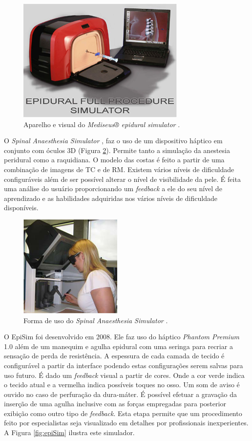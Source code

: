 \begin{figure}[ht!]
    \centering
    \includegraphics[width=0.6\linewidth]{capitulos/figuras/mediseusSimulator.png} 
    \caption{Aparelho e visual do \textit{Mediseus® epidural simulator}  \cite{Mayooran2006}.}
    \label{fig:mediseusSimulator}
\end{figure}

O \textit{Spinal Anaesthesia Simulator} \cite{Albert2007,Dreifaldt2006}, faz o uso de um dispositivo háptico em conjunto com óculos 3D (Figura \ref{fig:spinalAnestesiaSim}). Permite tanto a simulação da anestesia peridural como a raquidiana. O modelo das costas é feito a partir de uma combinação de imagens de \acrfull{TC} e de \acrshort{RM}. Existem vários níveis de dificuldade configuráveis além de ser possível alterar o nível de visibilidade da pele. É feita uma análise do usuário proporcionando um \textit{feedback} a ele do seu nível de aprendizado e as habilidades adquiridas nos vários níveis de dificuldade disponíveis.

\begin{figure}[ht!]
    \centering
    \includegraphics[width=0.3\linewidth]{capitulos/figuras/spinalAnestesiaSim.png} 
    \caption{Forma de uso do \textit{Spinal Anaesthesia Simulator}  \cite{Dreifaldt2006}.}
    \label{fig:spinalAnestesiaSim}
\end{figure}

O EpiSim \cite{YantricInc2011} foi desenvolvido em 2008. Ele faz uso do háptico \textit{Phantom Premium} 1.0 além de um manequim e agulha epidural com uma seringa para recriar a sensação de perda de resistência. A espessura de cada camada de tecido é configurável a partir da interface podendo estas configurações serem salvas para uso futuro. É dado um \textit{feedback} visual a partir de cores. Onde a cor verde indica o tecido atual e a vermelha indica possíveis toques no osso. Um som de aviso é ouvido no caso de perfuração da dura-máter. É possível efetuar a gravação da inserção de uma agulha inclusive com as forças empregadas para posterior exibição como outro tipo de \textit{feedback}. Esta etapa permite que um procedimento feito por especialistas seja visualizado em detalhes por profissionais inexperientes. A Figura \ref{fig:epiSim} ilustra este simulador.

